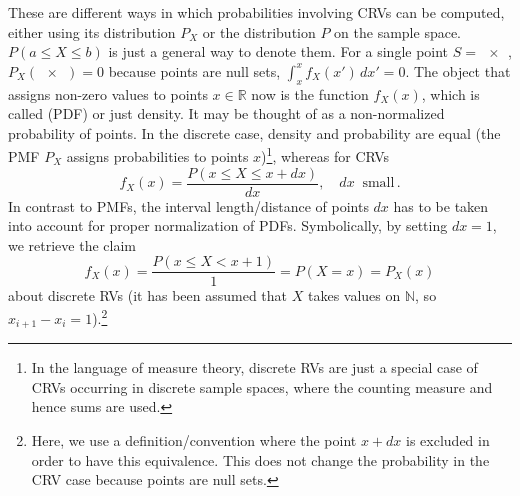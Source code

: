 These are different ways in which probabilities involving CRVs can be computed, either using its distribution $P_X$ or the distribution $P$ on the sample space. $P(a \leq X \leq b)$ is just a general way to denote them. 
For a single point $S = \qty{x}$, $P_X(\qty{x}) = 0$ because points are null sets, $\int_x^x f_X(x') \, dx' = 0$. The object that assigns non-zero values to points $x \in \mathbb{R}$ now is the function $f_X(x)$, which is called  (PDF) or just density. It may be thought of as a non-normalized probability of points. In the discrete case, density and probability are equal (the PMF $P_X$ assigns probabilities to points $x$)\footnote{In the language of measure theory, discrete RVs are just a special case of CRVs occurring in discrete sample spaces, where the counting measure and hence sums are used.}, whereas for CRVs
\begin{equation}\label{eq:def_PDF}
f_X(x) = \frac{P(x \leq X \leq x + dx)}{dx}, \quad dx~\text{ small} \, .
\end{equation}
In contrast to PMFs, the interval length/distance of points $dx$ has to be taken into account for proper normalization of PDFs. Symbolically, by setting $dx = 1$, we retrieve the claim
\begin{equation}
f_X(x) = \frac{P(x \leq X < x + 1)}{1} = P(X = x) = P_X(x)
\end{equation}
about discrete RVs (it has been assumed that $X$ takes values on $\mathbb{N}$, so $x_{i + 1} - x_i = 1$).\footnote{Here, we use a definition/convention where the point $x + dx$ is excluded in order to have this equivalence. This does not change the probability in the CRV case because points are null sets.}


